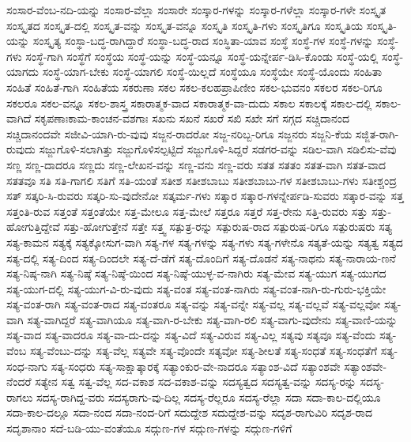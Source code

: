 {ಸಂಸಾರ-ವೆಂಬ-ನದಿ-ಯನ್ನು
ಸಂಸಾರ-ವೆಲ್ಲಾ
ಸಂಸಾರೇ
ಸಂಸ್ಕಾರ-ಗಳನ್ನು
ಸಂಸ್ಕಾರ-ಗಳೆಲ್ಲಾ
ಸಂಸ್ಕಾರ-ಗಳೇ
ಸಂಸ್ಕೃತ
ಸಂಸ್ಕೃತದ
ಸಂಸ್ಕೃತ-ದಲ್ಲಿ
ಸಂಸ್ಕೃತ-ವನ್ನು
ಸಂಸ್ಕೃತ-ವನ್ನೂ
ಸಂಸ್ಕೃತಿ
ಸಂಸ್ಕೃತಿ-ಗಳು
ಸಂಸ್ಕೃತಿಗೂ
ಸಂಸ್ಕೃತಿಯ
ಸಂಸ್ಕೃತಿ-ಯನ್ನು
ಸಂಸ್ಕೃತ್ಯ
ಸಂಸ್ಥಾ-ಬದ್ಧ-ರಾಗಿದ್ದಾರೆ
ಸಂಸ್ಥಾ-ಬದ್ಧ-ರಾದ
ಸಂಸ್ಥಿತಾ-ಯಾವ
ಸಂಸ್ಥೆ
ಸಂಸ್ಥೆ-ಗಳ
ಸಂಸ್ಥೆ-ಗಳನ್ನು
ಸಂಸ್ಥೆ-ಗಳು
ಸಂಸ್ಥೆ-ಗಾಗಿ
ಸಂಸ್ಥೆಗೆ
ಸಂಸ್ಥೆಯ
ಸಂಸ್ಥೆ-ಯನ್ನು
ಸಂಸ್ಥೆ-ಯನ್ನೂ
ಸಂಸ್ಥೆ-ಯನ್ನೇರ್ಪ-ಡಿಸಿ-ಕೊಂಡು
ಸಂಸ್ಥೆ-ಯಲ್ಲಿ
ಸಂಸ್ಥೆ-ಯಾಗದು
ಸಂಸ್ಥೆ-ಯಾಗ-ಬೇಕು
ಸಂಸ್ಥೆ-ಯಾಗಲಿ
ಸಂಸ್ಥೆ-ಯಿಲ್ಲದೆ
ಸಂಸ್ಥೆಯೂ
ಸಂಸ್ಥೆಯೇ
ಸಂಸ್ಥೆ-ಯೊಂದು
ಸಂಹಿತಾ
ಸಂಹಿತೆ
ಸಂಹಿತೆ-ಗಾಗಿ
ಸಂಹಿತೆಯ
ಸಕರುಣಾ
ಸಕಲ
ಸಕಲ-ಕಲಹಪ್ರಾಪಿಣೀಂ
ಸಕಲ-ಭುವನಂ
ಸಕಲರ
ಸಕಲ-ರಿಗೂ
ಸಕಲರೂ
ಸಕಲ-ವನ್ನೂ
ಸಕಲ-ಶಾಸ್ತ್ರ
ಸಕಾರಾತ್ಮಕ-ವಾದ
ಸಕಾರಾತ್ಮಕ-ವಾ-ದುದು
ಸಕಾಲ
ಸಕಾಲಕ್ಕೆ
ಸಕಾಲ-ದಲ್ಲಿ
ಸಕಾಲ-ವಾಗಿದೆ
ಸಕೃಪಣಾಃಕಾಮ-ಕಾಂಚನ-ವಶಗಾಃ
ಸಖನು
ಸಖನೆ
ಸಖರೆ
ಸಖಿ
ಸಖೇ
ಸಗೆ
ಸಗ್ಗದ
ಸಚ್ಚಿದಾನಂದ
ಸಚ್ಚಿದಾನಂದವೇ
ಸಜೀವಿ-ಯಾಗಿ-ರು-ವುವು
ಸಜ್ಜನ-ರಾದರೋ
ಸಜ್ಜ-ನರಿಬ್ಬ-ರಿಗೂ
ಸಜ್ಜನರು
ಸಜ್ಜನಿ-ಕೆಯ
ಸಜ್ಜಿತ-ರಾಗಿ-ರುವುದು
ಸಜ್ಜುಗೊಳಿ-ಸಲಾಗಿತ್ತು
ಸಜ್ಜುಗೊಳಿಸಲ್ಪಟ್ಟಿದೆ
ಸಜ್ಜುಗೊಳಿ-ಸಿದ್ದರೆ
ಸಡಗರ-ವನ್ನು
ಸಡಿಲ-ವಾಗಿ
ಸಡಿಲಿಸು-ವೆವು
ಸಣ್ಣ
ಸಣ್ಣ-ದಾದರೂ
ಸಣ್ಣದು
ಸಣ್ಣ-ಲೇಖನ-ವನ್ನು
ಸಣ್ಣ-ವನು
ಸಣ್ಣ-ವರು
ಸತತ
ಸತತಂ
ಸತತ-ವಾಗಿ
ಸತತ-ವಾದ
ಸತತವೂ
ಸತಿ
ಸತಿ-ಗಾಗಲಿ
ಸತಿಗೆ
ಸತಿ-ಯಂತೆ
ಸತೀಶ
ಸತೀಶಬಾಬು
ಸತೀಶಬಾಬು-ಗಳ
ಸತೀಶಬಾಬು-ಗಳು
ಸತೀಶ್ಚಂದ್ರ
ಸತ್
ಸತ್ಕರಿ-ಸಿ-ರುವರು
ಸತ್ಕರಿ-ಸು-ವುದೇನೋ
ಸತ್ಕರ್ಮ-ಗಳು
ಸತ್ಕಾರ
ಸತ್ಕಾರ-ಗಳನ್ನೇರ್ಪಡಿ-ಸುವರು
ಸತ್ಕಾರ-ವನ್ನು
ಸತ್ತ
ಸತ್ತಂತಿ-ರುವ
ಸತ್ತಂತೆ
ಸತ್ತಂತೆಯೇ
ಸತ್ತ-ಮೇಲೂ
ಸತ್ತ-ಮೇಲೆ
ಸತ್ತರೂ
ಸತ್ತರೆ
ಸತ್ತ-ರೇನು
ಸತ್ತಿ-ರುವರು
ಸತ್ತು
ಸತ್ತು-ಹೋಗುತ್ತಿದ್ದೇವೆ
ಸತ್ತು-ಹೋಗುತ್ತೇನೆ
ಸತ್ತೇ
ಸತ್ತ್ವ
ಸತ್ಪುತ್ರ-ರನ್ನು
ಸತ್ಪುರುಷ-ರಾದ
ಸತ್ಪುರುಷ-ರಿಗೂ
ಸತ್ಪುರುಷರು
ಸತ್ಯ
ಸತ್ಯ-ಕಾಮನ
ಸತ್ಯಕ್ಕೆ
ಸತ್ಯಕ್ಕೋಸುಗ-ವಾಗಿ
ಸತ್ಯ-ಗಳ
ಸತ್ಯ-ಗಳನ್ನು
ಸತ್ಯ-ಗಳು
ಸತ್ಯ-ಗಳೇನೊ
ಸತ್ಯತೆ-ಯನ್ನು
ಸತ್ಯತ್ವ
ಸತ್ಯದ
ಸತ್ಯ-ದಲ್ಲಿ
ಸತ್ಯ-ದಿಂದ
ಸತ್ಯ-ದಿಂದಲೇ
ಸತ್ಯ-ದೆ-ಡೆಗೆ
ಸತ್ಯ-ದೊಂದಿಗೆ
ಸತ್ಯ-ದೊಡನೆ
ಸತ್ಯ-ನಾಥನು
ಸತ್ಯ-ನಾರಾಯ-ಣನೆ
ಸತ್ಯ-ನಿಷ್ಠ-ನಾಗಿ
ಸತ್ಯ-ನಿಷ್ಠೆ
ಸತ್ಯ-ನಿಷ್ಠೆ-ಯಿಂದ
ಸತ್ಯ-ನಿಷ್ಠೆ-ಯುಳ್ಳ-ವ-ನಾಗಿರು
ಸತ್ಯ-ಮೇವ
ಸತ್ಯ-ಯುಗ
ಸತ್ಯ-ಯುಗದ
ಸತ್ಯ-ಯುಗ-ದಲ್ಲಿ
ಸತ್ಯ-ಯುಗ-ವಿ-ರು-ವುದು
ಸತ್ಯ-ವಂತ
ಸತ್ಯ-ವಂತ-ನಾಗಿರು
ಸತ್ಯ-ವಂತ-ನಾಗಿ-ರು-ಗುರು-ಭಕ್ತಿಯೇ
ಸತ್ಯ-ವಂತ-ರಾಗಿ
ಸತ್ಯ-ವಂತ-ರಾದ
ಸತ್ಯ-ವಂತರೂ
ಸತ್ಯ-ವನ್ನು
ಸತ್ಯ-ವನ್ನೇ
ಸತ್ಯ-ವಲ್ಲ
ಸತ್ಯ-ವಲ್ಲವೆ
ಸತ್ಯ-ವಲ್ಲವೋ
ಸತ್ಯ-ವಾಗಿ
ಸತ್ಯ-ವಾಗಿದ್ದರೆ
ಸತ್ಯ-ವಾಗಿಯೂ
ಸತ್ಯ-ವಾಗಿ-ರ-ಬೇಕು
ಸತ್ಯ-ವಾಗಿ-ರಲಿ
ಸತ್ಯ-ವಾಗು-ವುದೇನು
ಸತ್ಯ-ವಾಣಿ-ಯನ್ನು
ಸತ್ಯ-ವಾದ
ಸತ್ಯ-ವಾದರೂ
ಸತ್ಯ-ವಾ-ದು-ದನ್ನು
ಸತ್ಯ-ವಿದೆ
ಸತ್ಯ-ವಿರುವ
ಸತ್ಯ-ವಿಲ್ಲ
ಸತ್ಯವು
ಸತ್ಯವೂ
ಸತ್ಯ-ವೆಂದು
ಸತ್ಯ-ವೆಂಬ
ಸತ್ಯ-ವೆಂಬು-ದನ್ನು
ಸತ್ಯ-ವೆಲ್ಲ
ಸತ್ಯವೇ
ಸತ್ಯ-ವೊಂದೇ
ಸತ್ಯವೋ
ಸತ್ಯ-ಶೀಲತೆ
ಸತ್ಯ-ಸಂಧತೆ
ಸತ್ಯ-ಸಂಧತೆಗೆ
ಸತ್ಯ-ಸಂಧ-ನಾಗು
ಸತ್ಯ-ಸಂಧರು
ಸತ್ಯ-ಸಾಕ್ಷಾತ್ಕಾರಕ್ಕೆ
ಸತ್ಯಾಂಕುರ-ವೇ-ನಾದರೂ
ಸತ್ಯಾಂಶ-ವಿದೆ
ಸತ್ಯಾಂಶವೇ
ಸತ್ಯಾಂಶವೇ-ನೆಂದರೆ
ಸತ್ಯೇನ
ಸತ್ವ
ಸತ್ವ-ವೆಲ್ಲ
ಸದ-ವಕಾಶ
ಸದ-ವಕಾಶ-ವನ್ನು
ಸದಸ್ಯತ್ವದ
ಸದಸ್ಯತ್ವ-ವನ್ನು
ಸದಸ್ಯ-ರನ್ನು
ಸದಸ್ಯ-ರಾಗಲು
ಸದಸ್ಯ-ರಾಗಿದ್ದ-ವರು
ಸದಸ್ಯರಾಗು-ವು-ದಿಲ್ಲ
ಸದಸ್ಯ-ರೆಲ್ಲರೂ
ಸದಸ್ಯ-ರೆಲ್ಲಾ
ಸದಾ
ಸದಾ-ಕಾಲ-ದಲ್ಲಿಯೂ
ಸದಾ-ಕಾಲ-ದಲ್ಲೂ
ಸದಾ-ನಂದ
ಸದಾ-ನಂದ-ರಿಗೆ
ಸದುದ್ದೇಶ
ಸದುದ್ದೇಶ-ವನ್ನು
ಸದೃಶ-ರಾಗುವಿರಿ
ಸದೃಶ-ರಾದ
ಸದೃಶಾನಾಂ
ಸದೆ-ಬಡಿ-ಯು-ವಂತೆಯೂ
ಸದ್ಗುಣ-ಗಳ
ಸದ್ಗುಣ-ಗಳನ್ನು
ಸದ್ಗುಣ-ಗಳಿಗೆ
}
